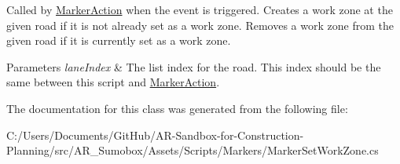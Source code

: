 Called by \mbox{\hyperlink{class_marker_action}{Marker\+Action}} when the event is triggered. Creates a work zone at the given road if it is not already set as a work zone. Removes a work zone from the given road if it is currently set as a work zone. 


\begin{DoxyParams}{Parameters}
{\em lane\+Index} & The list index for the road. This index should be the same between this script and \mbox{\hyperlink{class_marker_action}{Marker\+Action}}.\\
\hline
\end{DoxyParams}


The documentation for this class was generated from the following file\+:\begin{DoxyCompactItemize}
\item 
C\+:/\+Users/\+Documents/\+Git\+Hub/\+A\+R-\/\+Sandbox-\/for-\/\+Construction-\/\+Planning/src/\+A\+R\+\_\+\+Sumobox/\+Assets/\+Scripts/\+Markers/Marker\+Set\+Work\+Zone.\+cs\end{DoxyCompactItemize}
